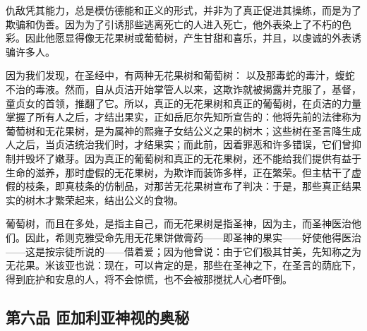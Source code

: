 仇敌凭其能力，总是模仿德能和正义的形式，并非为了真正促进其操练，而是为了欺骗和伪善。因为为了引诱那些逃离死亡的人进入死亡，他外表染上了不朽的色彩。因此他愿显得像无花果树或葡萄树，产生甘甜和喜乐，并且，以虔诚的外表诱骗许多人。\par

因为我们发现，在圣经中，有两种无花果树和葡萄树： 以及那毒蛇的毒汁，蝮蛇不治的毒液。然而，自从贞洁开始掌管人以来，这欺诈就被揭露并克服了，基督，童贞女的首领，推翻了它。所以，真正的无花果树和真正的葡萄树，在贞洁的力量掌握了所有人之后，才结出果实，正如岳厄尔先知所宣告的：他将先前的法律称为葡萄树和无花果树，是为属神的熙雍子女结公义之果的树木；这些树在圣言降生成人之后，当贞洁统治我们时，才结果实；而此前，因着罪恶和许多错误，它们曾抑制并毁坏了嫩芽。因为真正的葡萄树和真正的无花果树，还不能给我们提供有益于生命的滋养，那时虚假的无花果树，为欺诈而装饰多样，正在繁荣。但主枯干了虚假的枝条，即真枝条的仿制品，对那苦无花果树宣布了判决：于是，那些真正结果实的树木才繁荣起来，结出公义的食物。\par

葡萄树，而且在多处，是指主自己，而无花果树是指圣神，因为主，而圣神医治他们。因此，希则克雅受命先用无花果饼做膏药——即圣神的果实——好使他得医治——这是按宗徒所说的——借着爱；因为他曾说：由于它们极其甘美，先知称之为无花果。米该亚也说：现在，可以肯定的是，那些在圣神之下，在圣言的荫庇下，得到庇护和安息的人，将不会惊慌，也不会被那搅扰人心者吓倒。\par


\subsection{第六品 匝加利亚神视的奥秘}

